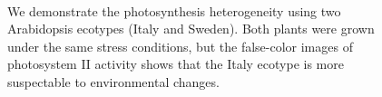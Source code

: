 \documentclass{bioinfo}
\begin{document}
\begin{figure}[tb]
\centering
{}~~~~~~~~~~
\vspace{-0.1in}
~~~
 \vspace{-0.2in}
\caption{\scriptsize We demonstrate the photosynthesis heterogeneity using two Arabidopsis ecotypes (Italy and Sweden). Both plants were grown under the same stress conditions, but the false-color images of photosystem II activity shows that the Italy ecotype is more suspectable to environmental changes. \vspace{-0.3in} } \label{fig:heterogeneityexample}
\end{figure}
\end{document}
